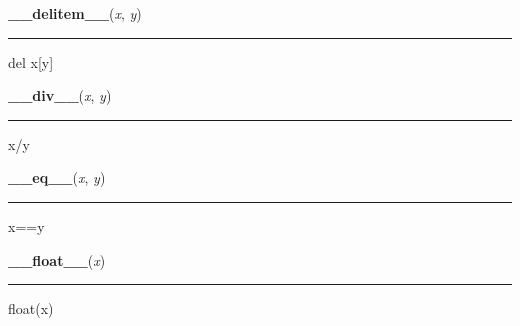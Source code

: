 \hspace{.8\funcindent}\begin{boxedminipage}{\funcwidth}

    \raggedright \textbf{\_\_delitem\_\_}(\textit{x}, \textit{y})

    \vspace{-1.5ex}

    \rule{\textwidth}{0.5\fboxrule}
\setlength{\parskip}{2ex}
    del x[y]

\setlength{\parskip}{1ex}
    \end{boxedminipage}

    \label{pygame:Color:__div__}

    \vspace{0.5ex}

\hspace{.8\funcindent}\begin{boxedminipage}{\funcwidth}

    \raggedright \textbf{\_\_div\_\_}(\textit{x}, \textit{y})

    \vspace{-1.5ex}

    \rule{\textwidth}{0.5\fboxrule}
\setlength{\parskip}{2ex}
    x/y

\setlength{\parskip}{1ex}
    \end{boxedminipage}

    \label{pygame:Color:__eq__}

    \vspace{0.5ex}

\hspace{.8\funcindent}\begin{boxedminipage}{\funcwidth}

    \raggedright \textbf{\_\_eq\_\_}(\textit{x}, \textit{y})

    \vspace{-1.5ex}

    \rule{\textwidth}{0.5\fboxrule}
\setlength{\parskip}{2ex}
    x==y

\setlength{\parskip}{1ex}
    \end{boxedminipage}

    \label{pygame:Color:__float__}

    \vspace{0.5ex}

\hspace{.8\funcindent}\begin{boxedminipage}{\funcwidth}

    \raggedright \textbf{\_\_float\_\_}(\textit{x})

    \vspace{-1.5ex}

    \rule{\textwidth}{0.5\fboxrule}
\setlength{\parskip}{2ex}
    float(x)

\setlength{\parskip}{1ex}
    \end{boxedminipage}

